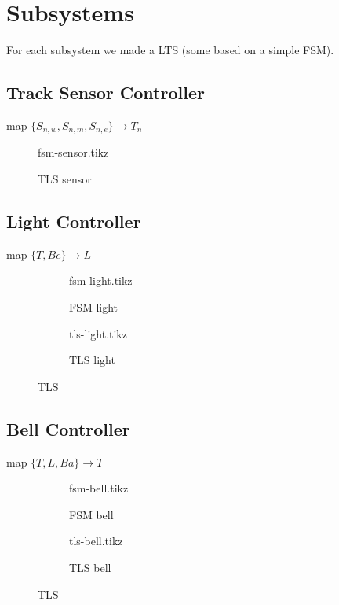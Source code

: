 \documentclass[final]{report}
\begin{document}
\chapter{Subsystems}
\label{ch:subsystems}
For each subsystem we made a LTS (some based on a simple FSM).

\section{Track Sensor Controller}
\label{sec:subsystems-track-sensor-controller}
map $\{S_{n,w},S_{n,m},S_{n,e}\} \rightarrow T_{n}$
	\begin{figure}[H]
		\centering
		{fsm-sensor.tikz}
		\caption{TLS sensor}
		\label{fig:tls-sensor}
	\end{figure}

\section{Light Controller}
\label{sec:subsystems-light-controller}
map $\{T,Be\} \rightarrow L$
	\begin{figure}[H]
		\centering
			\begin{subfigure}[b]{0.4\textwidth}
		\centering
				{fsm-light.tikz}
				\caption{FSM light}
				\label{fig:fsm-light}
			\end{subfigure}
			\begin{subfigure}[b]{0.4\textwidth}
		\centering
				{tls-light.tikz}
				\caption{TLS light}
				\label{fig:tls-light}
			\end{subfigure}
		\caption{TLS}
		\label{fig:light}
	\end{figure}

\section{Bell Controller}
\label{sec:subsystems-bell-controller}
map $\{T,L,Ba\} \rightarrow T$
	\begin{figure}[H]
		\centering
			\begin{subfigure}[b]{0.4\textwidth}
				{fsm-bell.tikz}
				\caption{FSM bell}
				\label{fig:fsm-bell}
			\end{subfigure}
			\begin{subfigure}[b]{0.4\textwidth}
				{tls-bell.tikz}
				\caption{TLS bell}
				\label{fig:tls-bell}
			\end{subfigure}
		\caption{TLS}
		\label{fig:bell}
	\end{figure}
\end{document}
